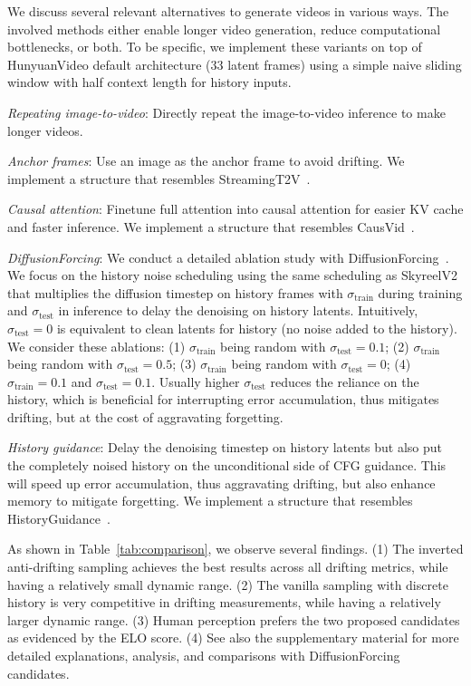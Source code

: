 \documentclass{article}
\begin{document}
We discuss several relevant alternatives to generate videos in various ways. The involved methods either enable longer video generation, reduce computational bottlenecks, or both. To be specific, we implement these variants on top of HunyuanVideo default architecture (33 latent frames) using a simple naive sliding window with half context length for history inputs. 

\emph{Repeating image-to-video}: Directly repeat the image-to-video inference to make longer videos.

\emph{Anchor frames}: Use an image as the anchor frame to avoid drifting. We implement a structure that resembles StreamingT2V~\cite{henschel2024streamingt2v}.

\emph{Causal attention}: Finetune full attention into causal attention for easier KV cache and faster inference. We implement a structure that resembles CausVid~\cite{yin2024slow}.

\emph{DiffusionForcing}: We conduct a detailed ablation study with DiffusionForcing~\cite{chen2025diffusion}. We focus on the history noise scheduling using the same scheduling as SkyreelV2~\cite{chen2025skyreelsv2infinitelengthfilmgenerative} that multiplies the diffusion timestep on history frames with $\sigma_{\text{train}}$ during training and $\sigma_{\text{test}}$ in inference to delay the denoising on history latents. Intuitively, $\sigma_{\text{test}}=0$ is equivalent to clean latents for history (no noise added to the history). We consider these ablations: (1) $\sigma_{\text{train}}$ being random with $\sigma_{\text{test}}=0.1$; (2) $\sigma_{\text{train}}$ being random with $\sigma_{\text{test}}=0.5$; (3) $\sigma_{\text{train}}$ being random with $\sigma_{\text{test}}=0$; (4) $\sigma_{\text{train}}=0.1$ and $\sigma_{\text{test}}=0.1$. Usually higher $\sigma_{\text{test}}$ reduces the reliance on the history, which is beneficial for interrupting error accumulation, thus mitigates drifting, but at the cost of aggravating forgetting.

\emph{History guidance}: Delay the denoising timestep on history latents but also put the completely noised history on the unconditional side of CFG guidance. This will speed up error accumulation, thus aggravating drifting, but also enhance memory to mitigate forgetting. We implement a structure that resembles HistoryGuidance~\cite{song2025history}.

As shown in Table~\ref{tab:comparison}, we observe several findings.
(1) The inverted anti-drifting sampling achieves the best results across all drifting metrics, while having a relatively small dynamic range.
(2) The vanilla sampling with discrete history is very competitive in drifting measurements, while having a relatively larger dynamic range.
(3) Human perception prefers the two proposed candidates as evidenced by the ELO score.
(4) See also the supplementary material for more detailed explanations, analysis, and comparisons with DiffusionForcing candidates.
\end{document}
